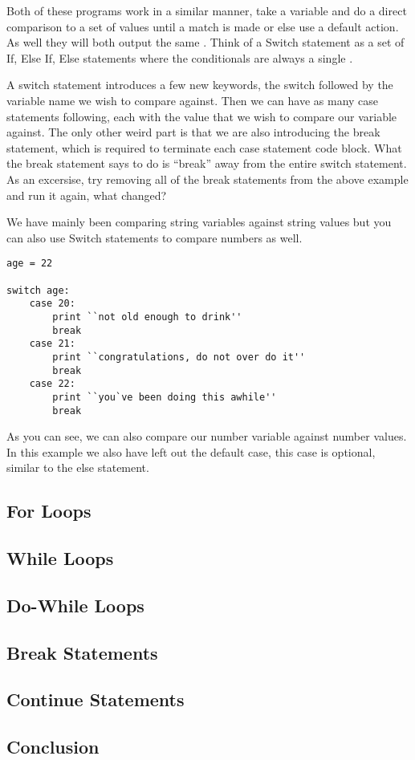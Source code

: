Both of these programs work in a similar manner, take a variable and do a direct comparison to a set of values until a match is made or else use a default action.
As well they will both output the same .
Think of a Switch statement as a set of If, Else If, Else statements where the conditionals are always a single \pigVar{==}.
\par

A switch statement introduces a few new keywords, the switch followed by the variable name we wish to compare against.
Then we can have as many case statements following, each with the value that we wish to compare our variable against.
The only other weird part is that we are also introducing the break statement, which is required to terminate each case statement code block.
What the break statement says to do is ``break'' away from the entire switch statement.
As an excersise, try removing all of the break statements from the above example and run it again, what changed?
\par

We have mainly been comparing string variables against string values but you can also use Switch statements to compare numbers as well.

\begin{lstlisting}[caption={Switch Statement Numbers Example}]
age = 22

switch age:
    case 20:
        print ``not old enough to drink''
        break
    case 21:
        print ``congratulations, do not over do it''
        break
    case 22:
        print ``you`ve been doing this awhile''
        break
\end{lstlisting}

As you can see, we can also compare our number variable against number values.
In this example we also have left out the default case, this case is optional, similar to the else statement.

\subsection{For Loops}

\subsection{While Loops}

\subsection{Do-While Loops}

\subsection{Break Statements}

\subsection{Continue Statements}

\subsection{Conclusion}
